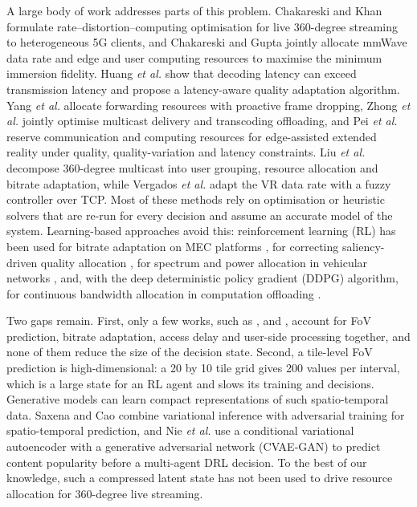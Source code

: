 \documentclass[conference]{IEEEtran}
\begin{document}
A large body of work addresses parts of this problem. Chakareski and Khan \cite{b2} formulate rate--distortion--computing optimisation for live 360-degree streaming to heterogeneous 5G clients, and Chakareski and Gupta \cite{b9} jointly allocate mmWave data rate and edge and user computing resources to maximise the minimum immersion fidelity. Huang \textit{et al.} \cite{b4} show that decoding latency can exceed transmission latency and propose a latency-aware quality adaptation algorithm. Yang \textit{et al.} \cite{b6} allocate forwarding resources with proactive frame dropping, Zhong \textit{et al.} \cite{b7} jointly optimise multicast delivery and transcoding offloading, and Pei \textit{et al.} \cite{b8} reserve communication and computing resources for edge-assisted extended reality under quality, quality-variation and latency constraints. Liu \textit{et al.} \cite{b12} decompose 360-degree multicast into user grouping, resource allocation and bitrate adaptation, while Vergados \textit{et al.} \cite{b3} adapt the VR data rate with a fuzzy controller over TCP. Most of these methods rely on optimisation or heuristic solvers that are re-run for every decision and assume an accurate model of the system. Learning-based approaches avoid this: reinforcement learning (RL) has been used for bitrate adaptation on MEC platforms \cite{b5}, for correcting saliency-driven quality allocation \cite{b10}, for spectrum and power allocation in vehicular networks \cite{b15}, and, with the deep deterministic policy gradient (DDPG) algorithm, for continuous bandwidth allocation in computation offloading \cite{b16}.

Two gaps remain. First, only a few works, such as \cite{b2}, \cite{b4} and \cite{b9}, account for FoV prediction, bitrate adaptation, access delay and user-side processing together, and none of them reduce the size of the decision state. Second, a tile-level FoV prediction is high-dimensional: a 20 by 10 tile grid gives 200 values per interval, which is a large state for an RL agent and slows its training and decisions. Generative models can learn compact representations of such spatio-temporal data. Saxena and Cao \cite{b13} combine variational inference with adversarial training for spatio-temporal prediction, and Nie \textit{et al.} \cite{b14} use a conditional variational autoencoder with a generative adversarial network (CVAE-GAN) to predict content popularity before a multi-agent DRL decision. To the best of our knowledge, such a compressed latent state has not been used to drive resource allocation for 360-degree live streaming.
\end{document}
